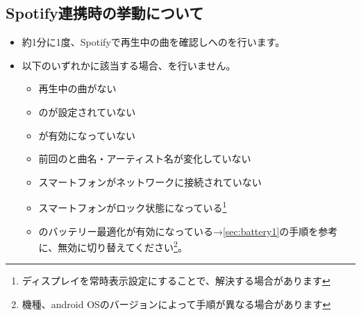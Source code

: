     \subsection{Spotify連携時の挙動について}
    \label{sec:spotify7}
    \begin{itemize}
        \item 約1分に1度、Spotifyで再生中の曲を確認し\mi への\nowplaying を行います。
        \item 以下のいずれかに該当する場合、\nowplaying を行いません。
        \begin{itemize}
            \item 再生中の曲がない
            \item \mi の\accessToken が設定されていない
            \item \nowplaying が有効になっていない
            \item 前回の\nowplaying と曲名・アーティスト名が変化していない
            \item スマートフォンがネットワークに接続されていない
            \item スマートフォンがロック状態になっている\footnote{ディスプレイを常時表示設定にすることで、解決する場合があります}
            \item \bj のバッテリー最適化が有効になっている→\ref{sec:battery1}の手順を参考に、無効に切り替えてください\footnote{機種、android OSのバージョンによって手順が異なる場合があります}。
        \end{itemize}
    \end{itemize}
